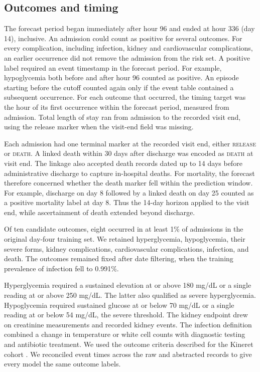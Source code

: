 \subsection{Outcomes and timing}
The forecast period began immediately after hour 96 and ended at hour 336 (day 14), inclusive. An admission could count as positive for several outcomes. For every complication, including infection, kidney and cardiovascular complications, an earlier occurrence did not remove the admission from the risk set. A positive label required an event timestamp in the forecast period. For example, hypoglycemia both before and after hour 96 counted as positive. An episode starting before the cutoff counted again only if the event table contained a subsequent occurrence. For each outcome that occurred, the timing target was the hour of its first occurrence within the forecast period, measured from admission. Total length of stay ran from admission to the recorded visit end, using the release marker when the visit-end field was missing.

Each admission had one terminal marker at the recorded visit end, either \textsc{release} or \textsc{death}. A linked death within 30 days after discharge was encoded as \textsc{death} at visit end. The linkage also accepted death records dated up to 14 days before administrative discharge to capture in-hospital deaths. For mortality, the forecast therefore concerned whether the death marker fell within the prediction window. For example, discharge on day 8 followed by a linked death on day 25 counted as a positive mortality label at day 8. Thus the 14-day horizon applied to the visit end, while ascertainment of death extended beyond discharge.

Of ten candidate outcomes, eight occurred in at least 1\% of admissions in the original day-four training set. We retained hyperglycemia, hypoglycemia, their severe forms, kidney complications, cardiovascular complications, infection, and death. The outcomes remained fixed after date filtering, when the training prevalence of infection fell to 0.991\%.

Hyperglycemia required a sustained elevation at or above 180 mg/dL or a single reading at or above 250 mg/dL. The latter also qualified as severe hyperglycemia. Hypoglycemia required sustained glucose at or below 70 mg/dL or a single reading at or below 54 mg/dL, the severe threshold. The kidney endpoint drew on creatinine measurements and recorded kidney events. The infection definition combined a change in temperature or white cell counts with diagnostic testing and antibiotic treatment. We used the outcome criteria described for the Kineret cohort \citep{oded2027kineret-jbi}. We reconciled event times across the raw and abstracted records to give every model the same outcome labels.

